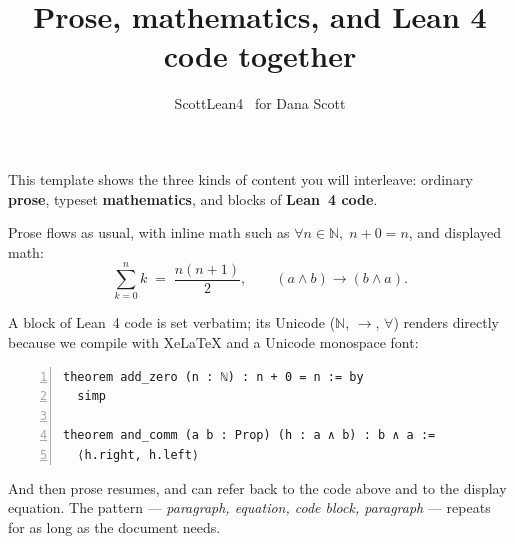 \documentclass[11pt]{article}
\title{Prose, mathematics, and Lean 4 code together}
\author{ScottLean4 \textperiodcentered\ for Dana Scott}
\date{}
\begin{document}
\maketitle

This template shows the three kinds of content you will interleave: ordinary
\textbf{prose}, typeset \textbf{mathematics}, and blocks of \textbf{Lean~4 code}.

\medskip
Prose flows as usual, with inline math such as
$\forall n \in \mathbb{N},\; n + 0 = n$, and displayed math:
\[
  \sum_{k=0}^{n} k \;=\; \frac{n(n+1)}{2}, \qquad
  (a \wedge b) \to (b \wedge a).
\]

A block of Lean~4 code is set verbatim; its Unicode ($\mathbb{N}$, $\to$, $\forall$)
renders directly because we compile with XeLaTeX and a Unicode monospace font:

\begin{Verbatim}[fontsize=\small, frame=leftline, framerule=0.4pt, numbers=left]
theorem add_zero (n : ℕ) : n + 0 = n := by
  simp

theorem and_comm (a b : Prop) (h : a ∧ b) : b ∧ a :=
  ⟨h.right, h.left⟩
\end{Verbatim}

\noindent
And then prose resumes, and can refer back to the code above and to the display
equation. The pattern — \emph{paragraph, equation, code block, paragraph} —
repeats for as long as the document needs.
\end{document}
